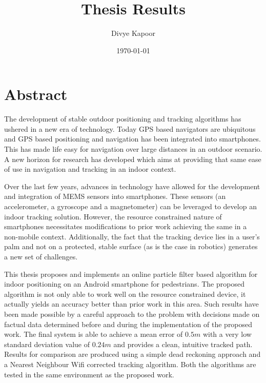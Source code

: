 \documentclass[11pt,a4paper,twoside]{book}
\begin{document}
\frontmatter

\title{Thesis Results}
\author{Divye Kapoor}
\date{\today}
\maketitle

\cleardoublepage
{}




\chapter{Abstract}

The development of stable outdoor positioning and tracking algorithms has 
ushered in a new era of technology. Today GPS based navigators are 
ubiquitous and GPS based positioning and navigation has been integrated 
into smartphones. This has made life easy for navigation over large 
distances in an outdoor scenario. A new horizon for research has developed which
aims at providing that same ease of use in navigation 
and tracking in an indoor context.

Over the last few years, advances in technology have allowed for the 
development and integration of MEMS sensors into smartphones. These sensors 
(an accelerometer, a gyroscope and a magnetometer) can be leveraged to 
develop an indoor tracking solution. However, the resource constrained nature 
of smartphones necessitates modifications to prior work achieving the same 
in a non-mobile context. Additionally, the fact that 
the tracking device lies in a user's palm and not on a protected, stable 
surface (as is the case in robotics) generates a new set of challenges.

This thesis proposes and implements an online particle filter based algorithm for 
indoor positioning on an Android smartphone for pedestrians. The proposed algorithm 
is not only able to work well on the resource constrained device, it actually
yields an accuracy better than prior work in this area. Such results have 
been made possible by a careful approach to the problem with decisions made 
on factual data determined before and during the implementation of the 
proposed work. The final system is able to achieve a mean error of $0.5 m$
with a very low standard deviation value of $0.24 m$ and provides a clean,
intuitive tracked path. Results for comparison are produced using
a simple dead reckoning approach and a Nearest Neighbour 
Wifi corrected tracking algorithm. Both the algorithms are tested in the same
environment as the proposed work.
\end{document}

